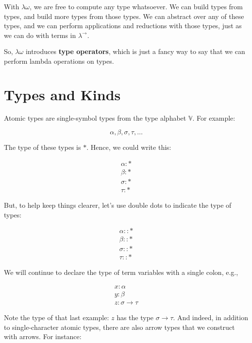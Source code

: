 \documentclass{book}
\numberwithin{equation}{chapter}
\newcommand{\vocab}{\textbf}
\begin{document}
With $\lambda\omega$, we are free to compute any type whatsoever. We can build types from types, and build more types from those types. We can abstract over any of these types, and we can perform applications and reductions with those types, just as we can do with terms in $\lambda^{\rightarrow}$.

So, $\lambda\omega$ introduces \vocab{type operators}, which is just a fancy way to say that we can perform lambda operations on types.


\section{Types and Kinds}

Atomic types are single-symbol types from the type alphabet $\mathbb{V}$. For example:

\begin{equation}
\alpha, \beta, \sigma, \tau, \ldots
\end{equation}

\noindent
The type of these types is $\ast$. Hence, we could write this:

\begin{align}
\alpha : \ast \\
\beta : \ast \\
\sigma : \ast \\
\tau : \ast
\end{align}

\noindent
But, to help keep things clearer, let's use double dots to indicate the type of types:

\begin{align}
\alpha :: \ast \\
\beta :: \ast \\
\sigma :: \ast \\
\tau :: \ast
\end{align}

\noindent
We will continue to declare the type of term variables with a single colon, e.g.,

\begin{align}
x : \alpha \\ 
y : \beta \\
z : \sigma \rightarrow \tau
\end{align}

\noindent
Note the type of that last example: $z$ has the type $\sigma \rightarrow \tau$. And indeed, in addition to single-character atomic types, there are also arrow types that we construct with arrows. For instance:
\end{document}

